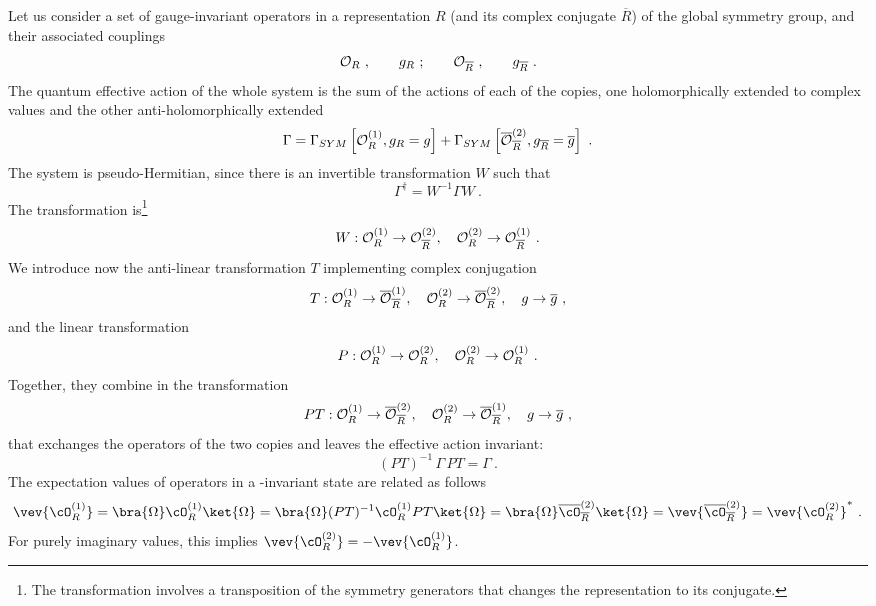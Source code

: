Let us consider a set of gauge-invariant operators in a representation $R$ (and its complex conjugate $\overline{R}$) of the global symmetry group, and their associated couplings
\begin{equation}
	{\cal O}_R\ ,\qquad g_R\ ;\qquad {\cal O}_{\overline{R}}\ ,\qquad g_{\overline{R}}\ .
\end{equation}
The quantum effective action of the whole system is the sum of the actions of each of the copies, one holomorphically extended to complex values and the other anti-holomorphically extended
\begin{equation}
	\Gamma=\Gamma_{SYM}\left[{\cal O}_R^{(1)},g_R=g\right]+\Gamma_{SYM}\left[\overline{{\cal O}}_{\overline{R}}^{(2)},g_{\overline{R}}=\overline{g}\right]\ .
\end{equation}
The system is pseudo-Hermitian, since there is an invertible transformation $W$ such that
\begin{equation}
\Gamma^\dagger=    W^{-1} \Gamma W\ .
\end{equation}
The transformation is\footnote{The transformation involves a transposition of the symmetry generators that changes the representation to its conjugate.}
\begin{equation}
	W: {\cal O}^{(1)}_R\to {\cal O}^{(2)}_{\overline{R}},\quad {\cal O}^{(2)}_R\to {\cal O}^{(1)}_{\overline{R}}\ .
\end{equation}
We introduce now the anti-linear transformation $T$ implementing complex conjugation
\begin{equation}
	T: {\cal O}^{(1)}_R\to \overline{{\cal O}}^{(1)}_{\overline{R}} ,\quad  {\cal O}^{(2)}_R\to \overline{{\cal O}}^{(2)}_{\overline{R}} ,\quad g\to \overline{g}\ ,
\end{equation}
and the linear transformation
\begin{equation}
	P: {\cal O}^{(1)}_R\to {\cal O}^{(2)}_R,\quad {\cal O}^{(2)}_R\to {\cal O}^{(1)}_R\ .
\end{equation}
Together, they combine in the \PT transformation
\begin{equation}
	PT: {\cal O}^{(1)}_R\to \overline{{\cal O}}^{(2)}_{\overline{R}}, \quad {\cal O}^{(2)}_R\to \overline{{\cal O}}^{(1)}_{\overline{R}},\quad g\to \overline{g}\ ,
\end{equation}
that exchanges the operators of the two copies and leaves the effective action invariant:
\begin{equation}
   (PT)^{-1}\, \Gamma\, PT=\Gamma\ .
\end{equation}
The expectation values of operators in a \PT-invariant state are related as follows
\begin{equation}
	\vev{\cO_R^{(1)}}=\bra{\Omega} \cO_R^{(1)} \ket{\Omega}=\bra{\Omega} (PT)^{-1}\cO_R^{(1)} PT\ket{\Omega}=\bra{\Omega} \overline{\cO}_{\overline{R}}^{(2)} \ket{\Omega}=\vev{\overline{\cO}_{\overline{R}}^{(2)}}=\vev{\cO_R^{(2)}}^*\ .
\end{equation}
For purely imaginary values, this implies $\vev{\cO_R^{(2)}}=-\vev{\cO_R^{(1)}}$.

